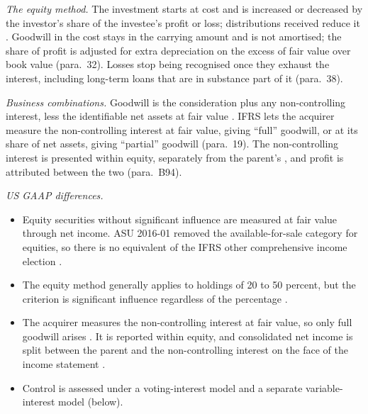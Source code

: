 \begin{qfdefinition}
\emph{The equity method.} The investment starts at cost and is increased or decreased by the investor's share of the investee's profit or loss; distributions received reduce it \citep[para.~10]{eu-2023-1803-ias28}. Goodwill in the cost stays in the carrying amount and is not amortised; the share of profit is adjusted for extra depreciation on the excess of fair value over book value (para.~32). Losses stop being recognised once they exhaust the interest, including long-term loans that are in substance part of it (para.~38).

\emph{Business combinations.} Goodwill is the consideration plus any non-controlling interest, less the identifiable net assets at fair value \citep[para.~32]{eu-2023-1803-ifrs3}. IFRS lets the acquirer measure the non-controlling interest at fair value, giving ``full'' goodwill, or at its share of net assets, giving ``partial'' goodwill (para.~19). The non-controlling interest is presented within equity, separately from the parent's \citep[para.~22]{eu-2023-1803-ifrs10}, and profit is attributed between the two (para.~B94).

\emph{US GAAP differences.}
\begin{itemize}
\item Equity securities without significant influence are measured at fair value through net income. ASU 2016-01 removed the available-for-sale category for equities, so there is no equivalent of the IFRS other comprehensive income election \citep[Summary]{us-equity-investments-2016}.
\item The equity method generally applies to holdings of 20 to 50 percent, but the criterion is significant influence regardless of the percentage \citep[p.~272]{financial-statement-analysis-2009}.
\item The acquirer measures the non-controlling interest at fair value, so only full goodwill arises \citep[para.~20]{us-business-combinations-2007}. It is reported within equity, and consolidated net income is split between the parent and the non-controlling interest on the face of the income statement \citep[Summary]{us-noncontrolling-interests-2007}.
\item Control is assessed under a voting-interest model and a separate variable-interest model (below).
\end{itemize}


\end{qfdefinition}
